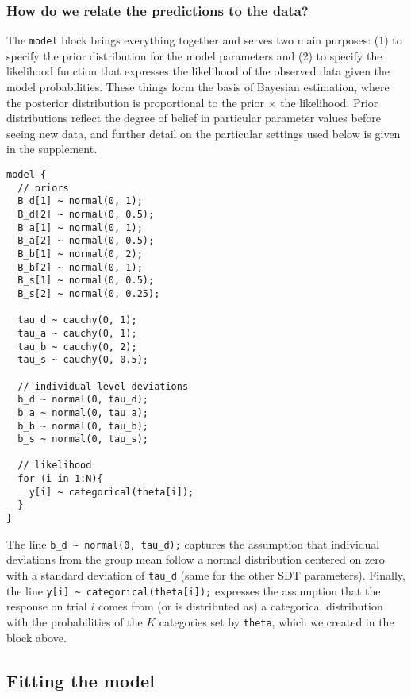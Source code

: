 \documentclass[
  english,
  ,man,floatsintext]{apa6}
\begin{document}
\hypertarget{how-do-we-relate-the-predictions-to-the-data}{%
\subsubsection{How do we relate the predictions to the data?}\label{how-do-we-relate-the-predictions-to-the-data}}

The \texttt{model} block brings everything together and serves two main purposes: (1) to specify the prior distribution for the model parameters and (2) to specify the likelihood function that expresses the likelihood of the observed data given the model probabilities. These things form the basis of Bayesian estimation, where the posterior distribution is proportional to the prior \(\times\) the likelihood. Prior distributions reflect the degree of belief in particular parameter values before seeing new data, and further detail on the particular settings used below is given in the supplement.

\begin{verbatim}
model {
  // priors
  B_d[1] ~ normal(0, 1);
  B_d[2] ~ normal(0, 0.5);
  B_a[1] ~ normal(0, 1);
  B_a[2] ~ normal(0, 0.5);
  B_b[1] ~ normal(0, 2);
  B_b[2] ~ normal(0, 1);
  B_s[1] ~ normal(0, 0.5);
  B_s[2] ~ normal(0, 0.25);
  
  tau_d ~ cauchy(0, 1);
  tau_a ~ cauchy(0, 1);
  tau_b ~ cauchy(0, 2);
  tau_s ~ cauchy(0, 0.5);
  
  // individual-level deviations
  b_d ~ normal(0, tau_d);
  b_a ~ normal(0, tau_a);
  b_b ~ normal(0, tau_b);
  b_s ~ normal(0, tau_s);
  
  // likelihood
  for (i in 1:N){
    y[i] ~ categorical(theta[i]);
  }
}
\end{verbatim}

The line \texttt{b\_d\ \textasciitilde{}\ normal(0,\ tau\_d);} captures the assumption that individual deviations from the group mean follow a normal distribution centered on zero with a standard deviation of \texttt{tau\_d} (same for the other SDT parameters). Finally, the line \texttt{y{[}i{]}\ \textasciitilde{}\ categorical(theta{[}i{]});} expresses the assumption that the response on trial \(i\) comes from (or is distributed as) a categorical distribution with the probabilities of the \(K\) categories set by \texttt{theta}, which we created in the block above.

\hypertarget{fitting-the-model}{%
\subsection{Fitting the model}\label{fitting-the-model}}
\end{document}
